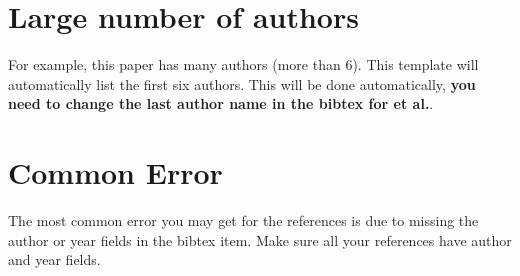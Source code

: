 \section{Large number of authors}

For example, this paper \citep{arnett1988american} has many authors (more than 6). This template will automatically list the first six authors. This will be done automatically, \textbf{you need to change the last author name in the bibtex for et al.}.

\section{Common Error}
The most common error you may get for the references is due to missing the author or year fields in the bibtex item. Make sure all your references have author and year fields.  


